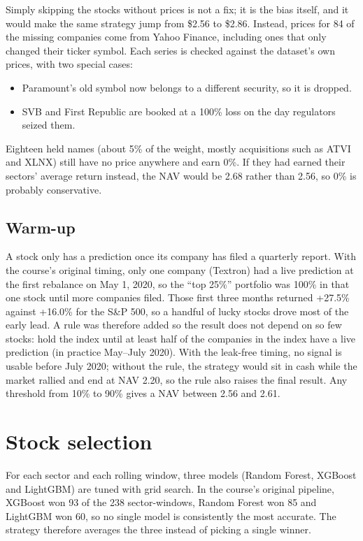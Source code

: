 \documentclass[10pt]{article}
\begin{document}
Simply skipping the stocks without prices is not a fix; it is the bias itself, and it would make the
same strategy jump from \$2.56 to \$2.86. Instead, prices for 84 of the missing companies come from
Yahoo Finance, including ones that only changed their ticker symbol. Each series is checked against
the dataset's own prices, with two special cases:
\begin{itemize}\setlength{\itemsep}{1pt}
\item Paramount's old symbol now belongs to a different security, so it is dropped.
\item SVB and First Republic are booked at a 100\% loss on the day regulators seized them.
\end{itemize}
Eighteen held names (about 5\% of the weight, mostly acquisitions such as ATVI and XLNX) still have no
price anywhere and earn 0\%. If they had earned their sectors' average return instead, the NAV would
be 2.68 rather than 2.56, so 0\% is probably conservative.

\subsection{Warm-up}
A stock only has a prediction once its company has filed a quarterly report. With the course's
original timing, only one company (Textron) had a live prediction at the first rebalance on May 1,
2020, so the ``top 25\%'' portfolio was 100\% in that one stock until more companies filed. Those first
three months returned +27.5\% against +16.0\% for the S\&P 500, so a handful of lucky stocks drove most
of the early lead. A rule was therefore added so the result does not depend on so few stocks: hold the
index until at least half of the companies in the index have a live prediction (in practice May--July
2020). With the leak-free timing, no signal is usable before July 2020; without the rule, the strategy
would sit in cash while the market rallied and end at NAV 2.20, so the rule also raises the final
result. Any threshold from 10\% to 90\% gives a NAV between 2.56 and 2.61.

\section{Stock selection}
For each sector and each rolling window, three models (Random Forest, XGBoost and LightGBM) are tuned
with grid search. In the course's original pipeline, XGBoost won 93 of the 238 sector-windows, Random
Forest won 85 and LightGBM won 60, so no single model is consistently the most accurate. The strategy
therefore averages the three instead of picking a single winner.
\end{document}
